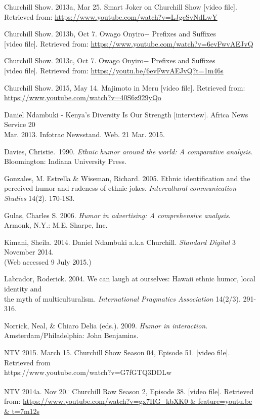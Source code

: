 \documentclass[output=paper]{langsci/langscibook}
\begin{document}
Churchill Show. 2013a, Mar 25. Smart Joker on Churchill Show
   [video file]. Retrieved from: \url{https://www.youtube.com/watch?v=LJgcSvNdLwY}

Churchill Show. 2013b, Oct 7. {Owago Onyiro$-$ Prefixes and Suffixes\\
}   [video file]. Retrieved from: \url{https://www.youtube.com/watch?v=6evFwvAEJvQ}

Churchill Show. 2013c, Oct 7. {Owago Onyiro$-$ Prefixes and Suffixes \\
}   [video file]. Retrieved from: \url{https://youtu.be/6evFwvAEJvQ?t=1m46s}

Churchill Show. 2015, May 14. Majimoto in Meru [video file]. Retrieved from: \\
   \url{https://www.youtube.com/watch?v=40S6z929yQo}

{\textquotedbl}Daniel Ndambuki - Kenya's Diversity Is Our Strength [interview].{\textquotedbl} Africa News Service 20 \\
   Mar. 2013. Infotrac Newsstand. Web. 21 Mar. 2015. 

Davies, Christie.~1990. \textit{Ethnic humor around the world: A comparative analysis}. Bloomington: Indiana University Press.

Gonzales, M. Estrella \& Wiseman, Richard. 2005. Ethnic identification and the perceived humor and rudeness of ethnic jokes. \textit{Intercultural communication Studies} 14(2).  170-183.

Gulas, Charles S. 2006. \textit{Humor in advertising: A comprehensive analysis}. Armonk, N.Y.: M.E. Sharpe, Inc.

Kimani, Sheila. 2014. Daniel Ndambuki a.k.a Churchill. \textit{Standard Digital} 3 November 2014. \\
   (Web accessed 9 July 2015.)

Labrador, Roderick. 2004. We can laugh at ourselves: Hawaii ethnic humor, local identity and \\
   the myth of multiculturalism. \textit{International Pragmatics Association }14(2/3). 291-316.

Norrick, Neal, \& Chiaro Delia (eds.). 2009. \textit{Humor in interaction}. Amsterdam/Philadelphia: John Benjamins.

NTV 2015. March 15. Churchill Show Season 04, Episode 51. [video file]. Retrieved from \\
   https://www.youtube.com/watch?v=G7fGTQ3DDLw

NTV 2014a. Nov 20.\textsuperscript{. }Churchill Raw Season 2, Episode 38. [video file]. Retrieved from: \url{https://www.youtube.com/watch?v=gx7HG_kbXK0 & feature=youtu.be & t=7m12s}
\end{document}
